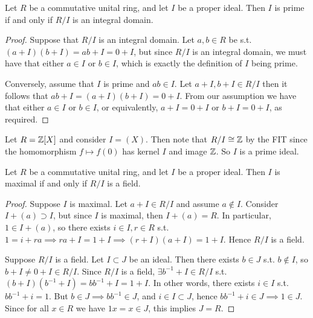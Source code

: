 \begin{theorem}
  Let $R$ be a commutative unital ring, and let $I$ be a proper ideal. Then $I$ is prime
  if and only if $R/I$ is an integral domain.
  \label{<+label+>}
\end{theorem}
\begin{proof}
  Suppose that $R/I$ is an integral domain. Let $a,b\in R$ be s.t. $(a+I)(b+I)=ab+I=0+I$,
  but since $R/I$ is an integral domain, we must have that either $a\in I$ or $b\in I$, which is
  exactly the definition of $I$ being prime.

  Conversely, assume that $I$ is prime and $ab \in I$. Let $a+I, b+I\in R/I$ then it follows that
  $ab+I=(a+I)(b+I)=0+I.$ From our assumption we have that either $a\in I$ or $ b\in I$, or equivalently, $a+I=0+I$ or $b+I=0+I$, as required.
\end{proof}

\begin{example}
  Let $R=\mathbb Z[X]$ and consider $I=(X)$. Then note that $R/I\cong\mathbb Z$ by the FIT since the
  homomorphism $f\mapsto f(0)$ has kernel $I$ and image $\mathbb Z$. So $I$ is a prime ideal.
\end{example}

\begin{theorem}
  Let $R$ be a commutative unital ring, and let $I$ be a proper ideal. Then $I$ is maximal
  if and only if $R/I$ is a field.
  \label{<+label+>}
\end{theorem}
\begin{proof}
  Suppose $I$ is maximal. Let $a+I\in R/I$ and assume $a\not\in I$. Consider $I+(a) \supset I$, but since $I$ is
  maximal, then $I+(a)= R$. In particular, $1\in I+(a)$, so there exists $i\in I, r\in R$
  s.t. $1=i+ra\implies ra+I=1+I \implies (r+I)(a+I)=1+I$. Hence $R/I$ is a field.


  Suppose $R/I$ is a field. Let $I\subset J$ be an ideal. Then there exists $b\in J$ s.t.
  $b\not\in I$, so $b+I\neq 0+I\in R/I$. Since $R/I$ is a field, $\exists b^{-1}+I\in R/I$
  s.t. $(b+I)(b^{-1}+I)=bb^{-1}+I = 1+I$. In other words, there exists $i\in I$ s.t. $bb^{-1}+i=1$. But $b\in J\implies bb^{-1}\in J$, and 
  $i\in I\subset J$, hence $bb^{-1}+i\in J\implies 1\in J$. Since for all $x\in R$ we have
  $1 x=x\in J$, this implies $J=R$.
\end{proof}
